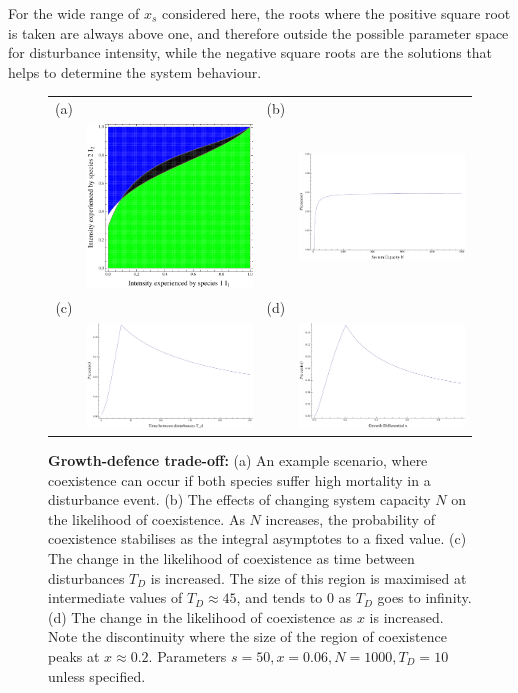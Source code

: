 For the wide range of $x_s$ considered here, the roots where the positive square root is taken are always above one, and therefore outside the possible parameter space for disturbance intensity, while the negative square roots are the solutions that helps to determine the system behaviour.
\begin{figure}[htbp]
\begin{tabular}{cccc}
(a)&&(b)&\\
&\includegraphics[width=2in]{gdx26}&&\includegraphics[width=2in]{gdtointwN} \\
(c)&&(d)&\\
&\includegraphics[width=2in]{gdtointwTd}&&\includegraphics[width=2in]{gdtointwx}
\end{tabular}
\caption{\textbf{Growth-defence trade-off:} (a) An example scenario, where coexistence can occur if both species suffer high mortality in a disturbance event. (b) The effects of changing system capacity $N$ on the likelihood of coexistence. As $N$ increases, the probability of coexistence stabilises as the integral asymptotes to a fixed value. (c) The change in the likelihood of coexistence as time between disturbances $T_D$ is increased. The size of this region is maximised at intermediate values of $T_D \approx 45$, and tends to 0 as $T_D$ goes to infinity. (d) The change in the likelihood of coexistence as $x$ is increased. Note the discontinuity where  the size of the region of coexistence peaks at $x\approx 0.2$. Parameters $s=50,x=0.06,N=1000,T_D=10$ unless specified.}
\label{gd}
\end{figure}

